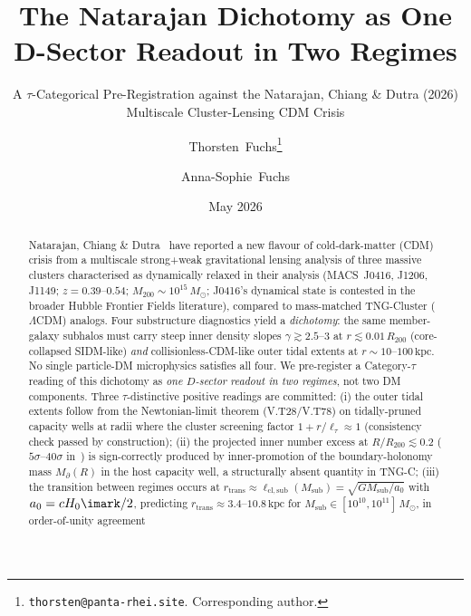 \documentclass{pantarhei-researchnote}
\newcommand{\aMOND}{a_0}                        %
\newcommand{\ellsub}{\ell_{\mathrm{cl},\mathrm{sub}}}  %
\newcommand{\elltauv}{\ell_\tau}                %
\newcommand{\Mpa}{M_{\partial}}                 %
\newcommand{\Msub}{M_{\mathrm{sub}}}
\newcommand{\Mtwohun}{M_{200}}
\newcommand{\Rtwohun}{R_{200}}
\newcommand{\kpc}{\mathrm{kpc}}
\newcommand{\Msun}{M_{\odot}}
\newcommand{\rtran}{r_{\mathrm{trans}}}
\begin{document}
\title{The Natarajan Dichotomy as One D-Sector Readout in Two Regimes}
\subtitle{A $\tau$-Categorical Pre-Registration against the Natarajan, Chiang \& Dutra (2026) Multiscale Cluster-Lensing CDM Crisis}

\author{%
  Thorsten~Fuchs\thanks{\texttt{thorsten@panta-rhei.site}. Corresponding author.}
  \and
  Anna-Sophie~Fuchs%
}

\date{May 2026}


\begin{abstract}
\noindent
Natarajan, Chiang \& Dutra~\cite{Natarajan2026} have reported a new flavour
of cold-dark-matter (CDM) crisis from a multiscale strong+weak gravitational
lensing analysis of three massive clusters characterised as dynamically
relaxed in their analysis (MACS~J0416, J1206, J1149; $z = 0.39$--$0.54$;
$\Mtwohun \sim 10^{15}\,\Msun$; J0416's dynamical state is contested in the
broader Hubble Frontier Fields literature), compared to mass-matched
TNG-Cluster ($\Lambda$CDM) analogs. Four substructure diagnostics yield a
\emph{dichotomy}: the same member-galaxy subhalos must carry steep inner
density slopes $\gamma \gtrsim 2.5$--$3$ at $r \lesssim 0.01\,\Rtwohun$
(core-collapsed SIDM-like) \emph{and} collisionless-CDM-like outer tidal
extents at $r \sim 10$--$100\,\kpc$. No single particle-DM microphysics
satisfies all four.
We pre-register a Category-$\tau$ reading of this dichotomy as
\emph{one $D$-sector readout in two regimes}, not two DM components. Three
$\tau$-distinctive positive readings are committed: (i) the outer tidal
extents follow from the Newtonian-limit theorem (V.T28/V.T78) on
tidally-pruned capacity wells at radii where the cluster screening
factor $1 + r/\elltauv \approx 1$ (consistency check passed by construction);
(ii) the projected inner number excess at $R/\Rtwohun \lesssim 0.2$
($5\sigma$--$40\sigma$ in~\cite{Natarajan2026}) is sign-correctly produced
by inner-promotion of the boundary-holonomy mass $\Mpa(R)$ in the host
capacity well, a structurally absent quantity in TNG-C; (iii) the
transition between regimes occurs at
$\rtran \approx \ellsub(\Msub) = \sqrt{G \Msub / \aMOND}$ with
$\aMOND = c H_0 \imark / 2$, predicting $\rtran \approx 3.4$--$10.8\,\kpc$
for $\Msub \in [10^{10}, 10^{11}]\,\Msun$, in order-of-unity agreement

\end{abstract}
\end{document}
